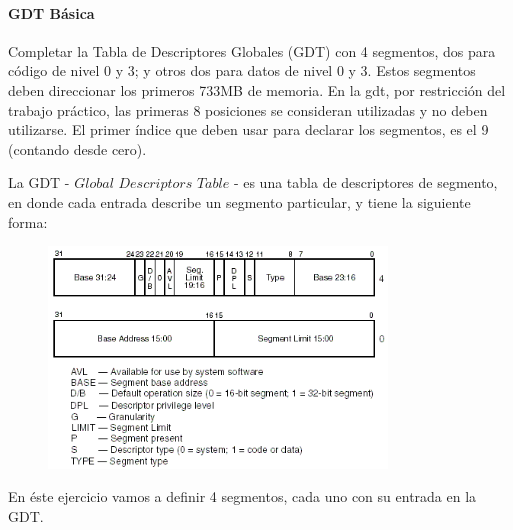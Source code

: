 \paragraph{GDT Básica}\label{subsubsec:ej1-a}
Completar la Tabla de Descriptores Globales (GDT) con 4 segmentos, dos para
código de nivel 0 y 3; y otros dos para datos de nivel 0 y 3. Estos segmentos
deben direccionar los primeros 733MB de memoria. En la gdt, por restricción del
trabajo práctico, las primeras 8 posiciones se consideran utilizadas y no
deben utilizarse. El primer índice que deben usar para declarar los segmentos,
es el 9 (contando desde cero).
\hruler

La GDT - $Global$ $Descriptors$ $Table$ - es una tabla de descriptores de segmento, en donde cada entrada describe
un segmento particular, y tiene la siguiente forma:

\begin{figure}[H]
\begin{center}
\includegraphics[width=9cm]{imagenes/gdt.png}
\end{center}
\end{figure}

En éste ejercicio vamos a definir 4 segmentos, cada uno con su entrada en la GDT.

